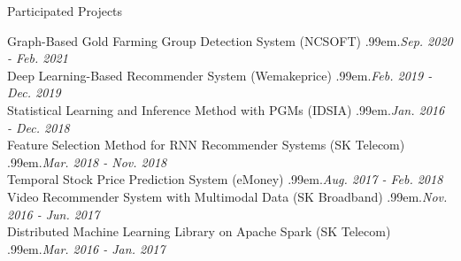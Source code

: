 \documentclass{resume} %
\makeatletter
\newcommand \Dotfill {\leavevmode \cleaders \hb@xt@ .99em{\hss .\hss }\hfill \kern \z@}
\makeatother
\begin{document}
\begin{rSection}{Participated Projects}

Graph-Based Gold Farming Group Detection System (NCSOFT) \smallskip \Dotfill \emph{Sep. 2020 - Feb. 2021} \\ 
Deep Learning-Based Recommender System (Wemakeprice) \smallskip \Dotfill \emph{Feb. 2019 - Dec. 2019} \\ 
Statistical Learning and Inference Method with PGMs (IDSIA) \smallskip \Dotfill \emph{Jan. 2016 - Dec. 2018} \\ 
Feature Selection Method for RNN Recommender Systems (SK Telecom) \smallskip \Dotfill \emph{Mar. 2018 - Nov. 2018} \\ 
Temporal Stock Price Prediction System (eMoney) \smallskip \Dotfill \emph{Aug. 2017 - Feb. 2018} \\ 
Video Recommender System with Multimodal Data (SK Broadband) \smallskip \Dotfill \emph{Nov. 2016 - Jun. 2017} \\ 
Distributed Machine Learning Library on Apache Spark (SK Telecom) \smallskip \Dotfill \emph{Mar. 2016 - Jan. 2017}

\end{rSection}

\end{document}
